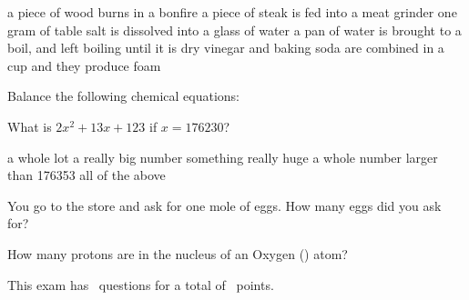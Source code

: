 \documentclass[11pt,addpoints]{exam}   	%
\begin{document}
\begin{questions}
\begin{choices}
\choice a piece of wood burns in a bonfire
\choice a piece of steak is fed into a meat grinder
\choice one gram of table salt is dissolved into a glass of water
\choice a pan of water is brought to a boil, and left boiling until it is dry
\choice vinegar and baking soda are combined in a cup and they produce foam
\end{choices}
\vspace{.2in}

\question
Balance the following chemical equations:
\vspace{.2in}

\pagebreak

\question[1] 
What is $2x^2 + 13x + 123$ if $ x = 176230 $?

\begin{choices}
\choice a whole lot
\choice a really big number
\choice something really huge
\choice a whole number larger than 176353
\choice all of the above
\end{choices}

\question[1]
You go to the store and ask for one mole of eggs. How many eggs did you ask for?

\question[1] 
How many protons are in the nucleus of an Oxygen () atom?

\end{questions}

\vspace{2in}

\begin{center}
This exam has \numquestions\ questions for a total of \numpoints\ points.
\end{center}
\end{document}
